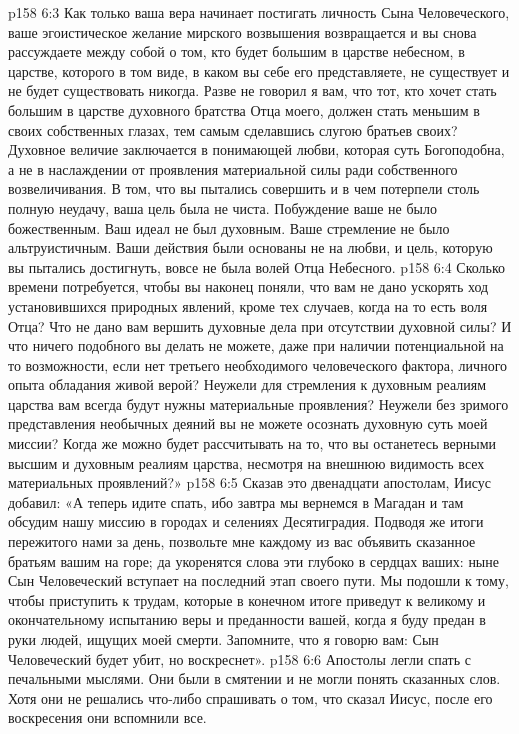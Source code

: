 \vs p158 6:3 Как только ваша вера начинает постигать личность Сына Человеческого, ваше эгоистическое желание мирского возвышения возвращается и вы снова рассуждаете между собой о том, кто будет большим в царстве небесном, в царстве, которого в том виде, в каком вы себе его представляете, не существует и не будет существовать никогда. Разве не говорил я вам, что тот, кто хочет стать большим в царстве духовного братства Отца моего, должен стать меньшим в своих собственных глазах, тем самым сделавшись слугою братьев своих? Духовное величие заключается в понимающей любви, которая суть Богоподобна, а не в наслаждении от проявления материальной силы ради собственного возвеличивания. В том, что вы пытались совершить и в чем потерпели столь полную неудачу, ваша цель была не чиста. Побуждение ваше не было божественным. Ваш идеал не был духовным. Ваше стремление не было альтруистичным. Ваши действия были основаны не на любви, и цель, которую вы пытались достигнуть, вовсе не была волей Отца Небесного.
\vs p158 6:4 Сколько времени потребуется, чтобы вы наконец поняли, что вам не дано ускорять ход установившихся природных явлений, кроме тех случаев, когда на то есть воля Отца? Что не дано вам вершить духовные дела при отсутствии духовной силы? И что ничего подобного вы делать не можете, даже при наличии потенциальной на то возможности, если нет третьего необходимого человеческого фактора, личного опыта обладания живой верой? Неужели для стремления к духовным реалиям царства вам всегда будут нужны материальные проявления? Неужели без зримого представления необычных деяний вы не можете осознать духовную суть моей миссии? Когда же можно будет рассчитывать на то, что вы останетесь верными высшим и духовным реалиям царства, несмотря на внешнюю видимость всех материальных проявлений?»
\vs p158 6:5 Сказав это двенадцати апостолам, Иисус добавил: «А теперь идите спать, ибо завтра мы вернемся в Магадан и там обсудим нашу миссию в городах и селениях Десятиградия. Подводя же итоги пережитого нами за день, позвольте мне каждому из вас объявить сказанное братьям вашим на горе; да укоренятся слова эти глубоко в сердцах ваших: ныне Сын Человеческий вступает на последний этап своего пути. Мы подошли к тому, чтобы приступить к трудам, которые в конечном итоге приведут к великому и окончательному испытанию веры и преданности вашей, когда я буду предан в руки людей, ищущих моей смерти. Запомните, что я говорю вам: Сын Человеческий будет убит, но воскреснет».
\vs p158 6:6 Апостолы легли спать с печальными мыслями. Они были в смятении и не могли понять сказанных слов. Хотя они не решались что\hyp{}либо спрашивать о том, что сказал Иисус, после его воскресения они вспомнили все.
